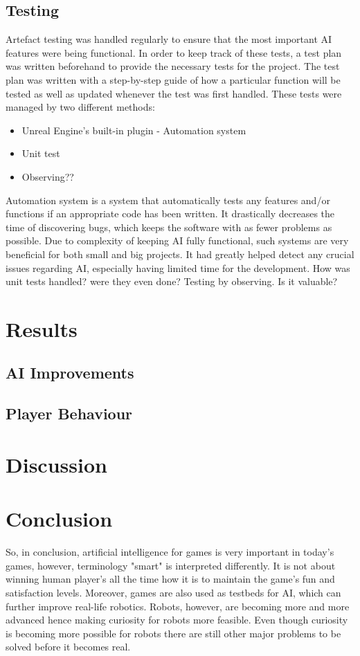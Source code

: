 \documentclass[journal]{IEEEtran}
\begin{document}
\subsection{Testing}
Artefact testing was handled regularly to ensure that the most important AI features were being functional. In order to keep track of these tests, a test plan was written beforehand to provide the necessary tests for the project. The test plan was written with a step-by-step guide of how a particular function will be tested as well as updated whenever the test was first handled. These tests were managed by two different methods: 
\begin{itemize}
	\item Unreal Engine's built-in plugin - Automation system
	\item Unit test
	\item Observing??
\end{itemize}
Automation system is a system that automatically tests any features and/or functions if an appropriate code has been written. It drastically decreases the time of discovering bugs, which keeps the software with as fewer problems as possible. Due to complexity of keeping AI fully functional, such systems are very beneficial for both small and big projects. It had greatly helped detect any crucial issues regarding AI, especially having limited time for the development.
How was unit tests handled? were they even done?
Testing by observing. Is it valuable?

\section{Results}
\subsection{AI Improvements}

\subsection{Player Behaviour}

\section{Discussion}

\section{Conclusion} %
So, in conclusion, artificial intelligence for games is very important in today's games, however, terminology "smart" is interpreted differently. It is not about winning human player's all the time how it is to maintain the game's fun and satisfaction levels. Moreover, games are also used as testbeds for AI, which can further improve real-life robotics. Robots, however, are becoming more and more advanced hence making curiosity for robots more feasible. Even though curiosity is becoming more possible for robots there are still other major problems to be solved before it becomes real.
\end{document}
